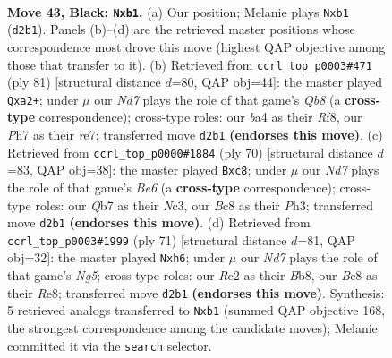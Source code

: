 \documentclass[11pt]{article}
\begin{document}
\clearpage

\begin{figure}[p]\centering
\begin{subfigure}{0.46\textwidth}\centering
\resizebox{\linewidth}{!}{%
\newchessgame
\chessboard[
  setfen={2b3k1/1q3p1p/6p1/4Pp2/BQ3P2/7N/P1rn2PP/1R2K3 b - - 2 43},
  showmover=false,
  pgfstyle=straightmove, color=movearrow, markmove={d2-b1}
]}
\caption{}
\end{subfigure}\hfill
\begin{subfigure}{0.46\textwidth}\centering
\resizebox{\linewidth}{!}{%
\newchessgame
\chessboard[
  setfen={5rk1/1p2R2p/p4np1/3PQbN1/2p2P1P/5B2/P6K/1q6 b - - 3 41},
  showmover=false,
  pgfstyle=straightmove, color=movearrow, markmove={b1-a2}
]}
\caption{}
\end{subfigure}
\\[4pt]
\begin{subfigure}{0.46\textwidth}\centering
\resizebox{\linewidth}{!}{%
\newchessgame
\chessboard[
  setfen={b1r2q1k/2r5/p2RBp1p/1p6/1n2PQ2/2N4P/6P1/6K1 w - - 2 36},
  showmover=false,
  pgfstyle=straightmove, color=movearrow, markmove={e6-c8}
]}
\caption{}
\end{subfigure}\hfill
\begin{subfigure}{0.46\textwidth}\centering
\resizebox{\linewidth}{!}{%
\newchessgame
\chessboard[
  setfen={1b2r1k1/1p3p2/p1q3pB/3N4/2PQ2n1/P7/1P4PP/3R3K b - - 2 36},
  showmover=false,
  pgfstyle=straightmove, color=movearrow, markmove={g4-h6}
]}
\caption{}
\end{subfigure}
\caption{\textbf{Move 43, Black: \texttt{Nxb1}.} (a) Our position; Melanie plays \texttt{Nxb1} (\texttt{d2b1}). Panels (b)--(d) are the retrieved master positions whose correspondence most drove this move (highest QAP objective among those that transfer to it). (b) Retrieved from \texttt{ccrl\_top\_p0003\#471} (ply 81) [structural distance $d$=80, QAP obj=44]: the master played \texttt{Qxa2+}; under $\mu$ our \emph{Nd7} plays the role of that game's \emph{Qb8} (a \textbf{cross-type} correspondence); cross-type roles: our \emph{b}a4 as their \emph{R}f8, our \emph{P}h7 as their \emph{r}e7; transferred move \texttt{d2b1} \textbf{(endorses this move)}. (c) Retrieved from \texttt{ccrl\_top\_p0000\#1884} (ply 70) [structural distance $d$=83, QAP obj=38]: the master played \texttt{Bxc8}; under $\mu$ our \emph{Nd7} plays the role of that game's \emph{Be6} (a \textbf{cross-type} correspondence); cross-type roles: our \emph{Q}b7 as their \emph{N}c3, our \emph{B}c8 as their \emph{P}h3; transferred move \texttt{d2b1} \textbf{(endorses this move)}. (d) Retrieved from \texttt{ccrl\_top\_p0003\#1999} (ply 71) [structural distance $d$=81, QAP obj=32]: the master played \texttt{Nxh6}; under $\mu$ our \emph{Nd7} plays the role of that game's \emph{Ng5}; cross-type roles: our \emph{R}c2 as their \emph{B}b8, our \emph{B}c8 as their \emph{R}e8; transferred move \texttt{d2b1} \textbf{(endorses this move)}. Synthesis: 5 retrieved analogs transferred to \texttt{Nxb1} (summed QAP objective 168, the strongest correspondence among the candidate moves); Melanie committed it via the \texttt{search} selector.}
\label{fig:thought-m85}
\end{figure}
\end{document}
